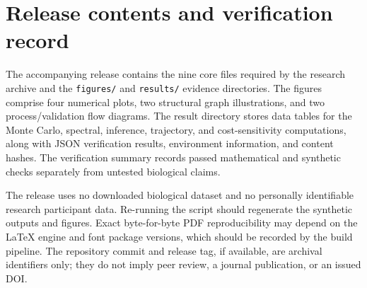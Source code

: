 \documentclass[12pt,a4paper]{article}
\begin{document}
\section{Release contents and verification record}
The accompanying release contains the nine core files required by the research archive and the \texttt{figures/} and \texttt{results/} evidence directories. The figures comprise four numerical plots, two structural graph illustrations, and two process/validation flow diagrams. The result directory stores data tables for the Monte Carlo, spectral, inference, trajectory, and cost-sensitivity computations, along with JSON verification results, environment information, and content hashes. The verification summary records passed mathematical and synthetic checks separately from untested biological claims.

The release uses no downloaded biological dataset and no personally identifiable research participant data. Re-running the script should regenerate the synthetic outputs and figures. Exact byte-for-byte PDF reproducibility may depend on the LaTeX engine and font package versions, which should be recorded by the build pipeline. The repository commit and release tag, if available, are archival identifiers only; they do not imply peer review, a journal publication, or an issued DOI.
\end{document}
